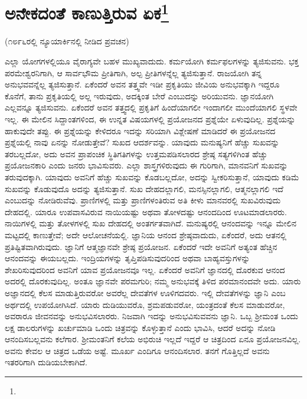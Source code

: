 
\chapter[ಅನೇಕದಂತೆ ಕಾಣುತ್ತಿರುವ ಏಕ]{ಅನೇಕದಂತೆ ಕಾಣುತ್ತಿರುವ ಏಕ\protect\footnote{}}

\begin{center}
(೧೮೯೬ರಲ್ಲಿ ನ್ಯೂಯಾರ್ಕಿನಲ್ಲಿ ನೀಡಿದ ಪ್ರವಚನ)
\end{center}

ಎಲ್ಲಾ ಯೋಗಗಳಲ್ಲಿಯೂ ವೈರಾಗ್ಯವೇ ಬಹಳ ಮುಖ್ಯವಾದುದು. ಕರ್ಮಯೋಗಿ ಕರ್ಮಫಲಗಳನ್ನು ತ್ಯಜಿಸುವನು. ಭಕ್ತ ಪರಮೇಶ್ವರನಿಗಾಗಿ, ಆ ಸಾರ್ವಭೌಮ ಪ್ರೀತಿಗಾಗಿ, ಅಲ್ಪ ಪ್ರೀತಿಗಳನ್ನೆಲ್ಲ ತ್ಯಜಿಸುತ್ತಾನೆ. ರಾಜಯೋಗಿ ತನ್ನ ಅನುಭವವನ್ನೆಲ್ಲ ತ್ಯಜಿಸುತ್ತಾನೆ. ಏಕೆಂದರೆ ಅವನ ತತ್ತ್ವವೇ ಇಡೀ ಪ್ರಕೃತಿಯು ಜೀವಿಯ ಅನುಭವಕ್ಕಾಗಿ ಇದ್ದರೂ ಕೊನೆಗೆ, ತಾನು ಪ್ರಕೃತಿಯಲ್ಲಿ ಅಲ್ಲ ಇರುವುದು, ಅದಕ್ಕಿಂತ ಬೇರೆ ಎಂಬುದನ್ನು ಅರಿಯುವನು. ಜ್ಞಾನಯೋಗಿ ಎಲ್ಲವನ್ನೂ ತ್ಯಜಿಸುವನು. ಏಕೆಂದರೆ ಅವನ ತತ್ತ್ವದಲ್ಲಿ ಪ್ರಕೃತಿಗೆ ಹಿಂದೆಯಾಗಲೀ ಇಂದಾಗಲೀ ಮುಂದೆಯಾಗಲಿ ಸ್ಥಳವೇ ಇಲ್ಲ. ಈ ಮೇಲಿನ ಸಿದ್ದಾಂತಗಳಿಂದ, ಈ ಉನ್ನತ ವಿಷಯಗಳಲ್ಲಿ ಪ್ರಯೋಜನದ ಪ್ರಶ್ನೆಯೇ ಏಳುವುದಿಲ್ಲ. ಪ್ರಶ್ನೆಯನ್ನು ಹಾಕುವುದೇ ತಪ್ಪು. ಈ ಪ್ರಶ್ನೆಯನ್ನು ಕೇಳಿದರೂ ಇದನ್ನು ಸರಿಯಾಗಿ ವಿಶ್ಲೇಷಣೆ ಮಾಡಿದರೆ ಈ ಪ್ರಯೋಜನದ ಪ್ರಶ್ನೆಯಲ್ಲಿ ನಾವು ಏನನ್ನು ನೋಡುತ್ತೇವೆ? ಸುಖದ ಆದರ್ಶವನ್ನು. ಯಾವುದು ಮನುಷ್ಯನಿಗೆ ಹೆಚ್ಚು ಸುಖವನ್ನು ತರಬಲ್ಲದೋ, ಅದು ಅವನ ಪ್ರಾಪಂಚಿಕ ಸ್ಥಿತಿಗತಿಗಳನ್ನು ಉತ್ತಮಪಡಿಸಲಾರದ ಶ್ರೇಷ್ಠ ಸತ್ಯಗಳಿಗಿಂತ ಹೆಚ್ಚು ಪ್ರಯೋಜನಕಾರಿ ಎಂದು ಜನರು ಭಾವಿಸುವರು. ಎಲ್ಲಾ ಶಾಸ್ತ್ರಗಳಿರುವುದು ಈ ಗುರಿಗಾಗಿ, ಮಾನವನಿಗೆ ಸುಖವನ್ನು ತರುವುದಕ್ಕಾಗಿ. ಯಾವುದು ಅವನಿಗೆ ಹೆಚ್ಚು ಸುಖವನ್ನು ಕೊಡಬಲ್ಲದೋ, ಅದನ್ನು ಸ್ವೀಕರಿಸುತ್ತಾನೆ, ಯಾವುದು ಕಡಿಮೆ ಸುಖವನ್ನು ಕೊಡುವುದೊ ಅದನ್ನು ತ್ಯಜಿಸುತ್ತಾನೆ. ಸುಖ ದೇಹದಲ್ಲಾಗಲಿ, ಮನಸ್ಸಿನಲ್ಲಾಗಲಿ, ಆತ್ಮನಲ್ಲಾಗಲಿ ಇದೆ ಎಂಬುದನ್ನು ನೋಡಿರುವೆವು. ಪ್ರಾಣಿಗಳಲ್ಲಿ ಮತ್ತು ಪ್ರಾಣಿಗಳಂತಿರುವ ಅತಿ ಕೀಳು ಮಾನವರಲ್ಲಿ ಸುಖವಿರುವುದು ದೇಹದಲ್ಲಿ. ಯಾರೂ ಉಪವಾಸವಿರುವ ನಾಯಿಯಷ್ಟು ಅಥವಾ ತೋಳದಷ್ಟು ಆನಂದದಿಂದ ಊಟಮಾಡಲಾರರು. ನಾಯಿಗಳಲ್ಲಿ ಮತ್ತು ತೋಳಗಳಲ್ಲಿ ಸುಖ ದೇಹದಲ್ಲಿ ಅಂತರ್ಗತವಾಗಿದೆ. ಮನುಷ್ಯರಲ್ಲಿ ಆನಂದವನ್ನು ಇನ್ನೂ ಮೇಲಿನ ಮಟ್ಟದಲ್ಲಿ ಕಾಣುತ್ತೇವೆ; ಅದೇ ಆಲೋಚನೆಯಲ್ಲಿ. ಜ್ಞಾನಿಯ ಆನಂದ ಶ್ರೇಷ್ಠವಾದುದು, ಏಕೆಂದರೆ, ಅದು ಆತನಲ್ಲಿ ಪ್ರತಿಷ್ಟಿತವಾಗಿರುವುದು. ಜ್ಞಾನಿಗೆ ಆತ್ಮಜ್ಞಾನವೇ ಶ್ರೇಷ್ಠ ಪ್ರಯೋಜನ. ಏಕೆಂದರೆ ಇದೇ ಅವನಿಗೆ ಅತ್ಯಂತ ಹೆಚ್ಚಿನ ಆನಂದವನ್ನು ಈಯಬಲ್ಲದು. ಇಂದ್ರಿಯಗಳನ್ನು ತೃಪ್ತಿಪಡಿಸುವುದರಿಂದ ಅಥವಾ ಬಾಹ್ಯವಸ್ತುಗಳನ್ನು ಶೇಖರಿಸುವುದರಿಂದ ಅವನಿಗೆ ಯಾವ ಪ್ರಯೋಜನವೂ ಇಲ್ಲ. ಏಕೆಂದರೆ ಅವನಿಗೆ ಜ್ಞಾನದಲ್ಲಿ ದೊರಕುವ ಆನಂದ ಅದರಲ್ಲಿ ದೊರಕುವುದಿಲ್ಲ. ಅಂತೂ ಜ್ಞಾನವೇ ಪರಮಗುರಿ; ನಮ್ಮ ಅನುಭವಕ್ಕೆ ತಿಳಿದ ಪರಮಾನಂದವೇ ಅದು. ಯಾರು ಅಜ್ಞಾನದಲ್ಲಿ ಕೆಲಸ ಮಾಡುತ್ತಿರುವರೋ ಅವರೆಲ್ಲ ದೇವತೆಗಳ ಊಳಿಗದವರು. ಇಲ್ಲಿ ದೇವತೆಗಳನ್ನು ಜ್ಞಾನಿ ಎಂಬ ಅರ್ಥದಲ್ಲಿ ಉಪಯೋಗಿಸಿದೆ. ಯಾರು ದುಡಿಯುವರೊ, ಶ್ರಮಪಡುವರೋ, ಯಂತ್ರದಂತೆ ಕೆಲಸ ಮಾಡುವರೋ, ಅವರಾರೂ ಜೀವನವನ್ನು ಅನುಭವಿಸಲಾರರು. ನಿಜವಾಗಿ ಇದನ್ನು ಅನುಭವಿಸುವವನು ಜ್ಞಾನಿ. ಒಬ್ಬ ಶ‍್ರೀಮಂತ ಒಂದು ಲಕ್ಷ ಡಾಲರುಗಳನ್ನು ಖರ್ಚುಮಾಡಿ ಒಂದು ಚಿತ್ರವನ್ನು ಕೊಳ್ಳುತ್ತಾನೆ ಎಂದು ಭಾವಿಸಿ, ಆದರೆ ಅದನ್ನು ನೋಡಿ ಆನಂದಿಸಬಲ್ಲವನು ಕಲೆಗಾರ. ಶ‍್ರೀಮಂತನಿಗೆ ಕಲೆಯ ಅಭಿರುಚಿ ಇಲ್ಲದೆ ಇದ್ದರೆ ಆ ಚಿತ್ರದಿಂದ ಏನೂ ಪ್ರಯೋಜನವಿಲ್ಲ. ಅವನು ಕೇವಲ ಆ ಚಿತ್ರದ ಒಡೆಯ ಅಷ್ಟೆ. ಮೂರ್ಖ ಎಂದಿಗೂ ಆನಂದಿಸಲಾರ. ತನಗೆ ಗೊತ್ತಿಲ್ಲದೆ ಅವನು ಇತರರಿಗಾಗಿ ದುಡಿಯಬೇಕಾಗಿದೆ.

